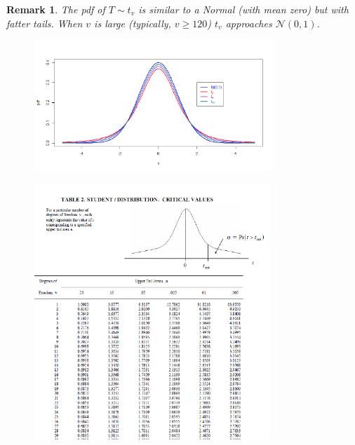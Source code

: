 \documentclass[smaller]{beamer}\usepackage[]{graphicx}\usepackage[]{color}
\newtheorem{remark}{Remark}[section]
\newcommand{\N}{\mathcal{N}}
\begin{document}
\begin{frame}{\subsecname}
  \begin{remark}
  The pdf of $T\sim t_{v}$ is similar to a Normal (with mean zero) but with fatter tails. When $v$ is large (typically, $v \geq 120$) $t_{v}$ approaches $\N(0,1)$.
  \end{remark}

  \begin{figure}[ptb]\centering
  \includegraphics[height=1.9398in, width=3.5345in]{img/student_t__4.pdf}%
  \end{figure}
\end{frame}

\begin{frame}{\subsecname}

\begin{figure}[ptb]\centering
\includegraphics[height=3.8in, width=3.506in]{img/Student_t_table__5.pdf}%
\end{figure}

\end{frame}

\end{document}
